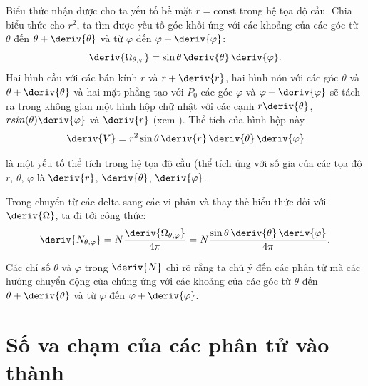 \noindent
Biểu thức nhận được cho ta yếu tố bề mặt $r=\text{const}$ trong hệ tọa độ cầu.
Chia biểu thức  cho $r^2$, ta tìm được yếu tố góc khối ứng với các khoảng của các góc từ $\theta$ đến $\theta+\deriv{\theta}$ và từ $\varphi$ dến $\varphi+\deriv{\varphi}$:
\begin{equation}\label{eq:11_15}
	\deriv{\Omega_{\theta,\varphi}} = \sin\theta\, \deriv{\theta} \,\deriv{\varphi}.
\end{equation}
Hai hình cầu với các bán kính $r$ và $r+\deriv{r}$, hai hình nón với các góc $\theta$ và $\theta+\deriv{\theta}$ và hai mặt phẳng tạo với $P_0$ các góc $\varphi$ và $\varphi+\deriv{\varphi}$ sẽ tách ra trong không gian một hình hộp chữ nhật với các cạnh $r\deriv{\theta}$, $rsin(\theta)\deriv{\varphi}$ và $\deriv{r}$ (xem ). Thể tích của hình hộp này
\begin{equation}\label{eq:11_16}
	\deriv{V} = r^2\sin\theta\, \deriv{r}\, \deriv{\theta} \,\deriv{\varphi}
\end{equation}

\noindent
là một yếu tố thể tích trong hệ tọa độ cầu (thể tích ứng với số gia của các tọa độ $r$, $\theta$, $\varphi$ là $\deriv{r}$, $\deriv{\theta}$, $\deriv{\varphi}$.

Trong  chuyển từ các delta sang các vi phân và thay thế biểu thức  đối với $\deriv{\Omega}$, ta đi tới công thức:
\begin{equation}\label{eq:11_17}
	\deriv{N_{\theta,\varphi}} = N\frac{\deriv{\Omega_{\theta,\varphi}}}{4\pi} = N\frac{\sin\theta\,\deriv{\theta}\,\deriv{\varphi}}{4\pi}.
\end{equation}

\noindent
Các chỉ số $\theta$ và $\varphi$ trong $\deriv{N}$ chỉ rõ rằng ta chú ý đến các phân tử mà các hướng chuyển động của chúng ứng với các khoảng của các góc từ $\theta$ đến $\theta+\deriv{\theta}$ và từ $\varphi$ đến $\varphi+\deriv{\varphi}$.

\section{Số va chạm của các phân tử vào thành}\label{sec:11_3}

